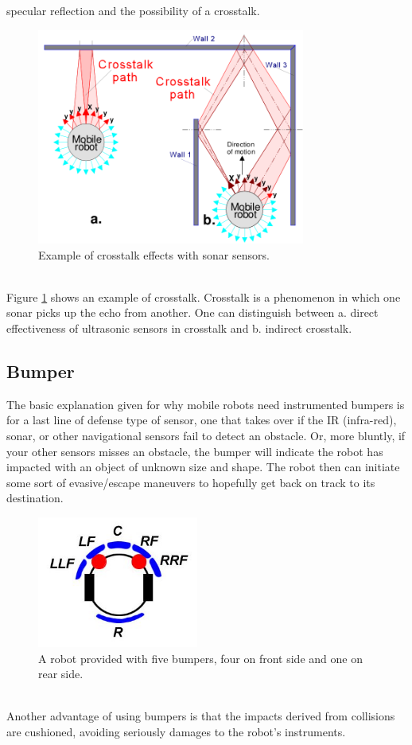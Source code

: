 specular reflection and the possibility of a crosstalk.
\begin{figure} [!h]
  \begin{center}
    \includegraphics[width=250pt]{img/sonar_crosstalk.png}
    \caption{Example of crosstalk effects with sonar sensors.}
    \label{fig:sonar_crosstalk}
  \end{center}
\end{figure}
\\
Figure \ref{fig:sonar_crosstalk} shows an example of crosstalk.
Crosstalk is a phenomenon in which one sonar picks up the echo
from another. One can distinguish between a. direct effectiveness
of ultrasonic sensors in crosstalk and b. indirect crosstalk.


\subsection{Bumper}
\label{intro:mobile:bumper}

The basic explanation given for why mobile robots need instrumented
bumpers is for a last line of defense type of sensor, one that takes
over if the IR (infra-red), sonar, or other navigational sensors fail
to detect an obstacle. Or, more bluntly, if your other sensors misses
an obstacle, the bumper will indicate the robot has impacted with an
object of unknown size and shape. The robot then can initiate some
sort of evasive/escape maneuvers to
hopefully get back on track to its destination.
\begin{figure} [!h]
  \begin{center}
    \includegraphics[width=200px]{img/bumpers.jpg}
    \caption{A robot provided with five bumpers, four on front
      side and one on rear side.}
    \label{fig:bumpers}
  \end{center}
\end{figure}
\\
Another advantage of using bumpers is that the impacts derived from
collisions are cushioned, avoiding seriously damages to the robot's
instruments.

